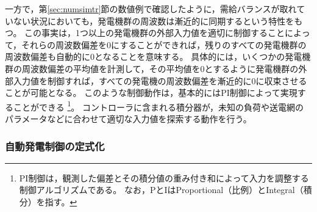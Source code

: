 \documentclass[tombow,dvipdfmx]{corona-a5-1.1}
\begin{document}
一方で，第\ref{sec:numsimtr}節の数値例で確認したように，需給バランスが取れていない状況においても，発電機群の周波数は漸近的に同期するという特性をもつ。
この事実は，1つ以上の発電機群の外部入力値を適切に制御することによって，それらの周波数偏差を0にすることができれば，残りのすべての発電機群の周波数偏差も自動的に0となることを意味する。
具体的には，いくつかの発電機群の周波数偏差の平均値を計測して，その平均値を0とするように発電機群の外部入力値を制御すれば，すべての発電機の周波数偏差を漸近的に0に収束させることが可能となる。
このような制御動作は，基本的にはPI制御によって実現することができる
\footnote{
PI制御は，観測した偏差とその積分値の重み付き和によって入力を調整する制御アルゴリズムである。
なお，PとIはProportional（比例）とIntegral（積分）を指す。
}。
コントローラに含まれる積分器が，未知の負荷や送電網のパラメータなどに合わせて適切な入力値を探索する動作を行う。

\subsubsection{自動発電制御の定式化}
\end{document}
